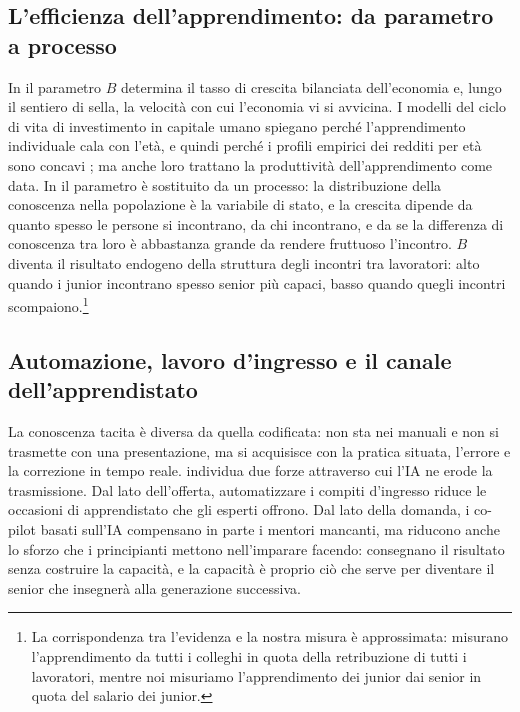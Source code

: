 \documentclass[preprint,12pt,authoryear]{elsarticle}
\begin{document}
\subsection{L'efficienza dell'apprendimento: da parametro a processo}

In \citet{Lucas1988} il parametro $B$ determina il tasso di crescita bilanciata dell'economia e, lungo il sentiero di sella, la velocità con cui l'economia vi si avvicina. I modelli del ciclo di vita di investimento in capitale umano \citep{BenPorath1967} spiegano perché l'apprendimento individuale cala con l'età, e quindi perché i profili empirici dei redditi per età sono concavi \citep{MurphyWelch1990,Lagakos2018}; ma anche loro trattano la produttività dell'apprendimento come data. In \citet{LucasMoll2014} il parametro è sostituito da un processo: la distribuzione della conoscenza nella popolazione è la variabile di stato, e la crescita dipende da quanto spesso le persone si incontrano, da chi incontrano, e da se la differenza di conoscenza tra loro è abbastanza grande da rendere fruttuoso l'incontro. $B$ diventa il risultato endogeno della struttura degli incontri tra lavoratori: alto quando i junior incontrano spesso senior più capaci, basso quando quegli incontri scompaiono.\footnote{La corrispondenza tra l'evidenza e la nostra misura è approssimata: \citet{Jarosch2021} misurano l'apprendimento da tutti i colleghi in quota della retribuzione di tutti i lavoratori, mentre noi misuriamo l'apprendimento dei junior dai senior in quota del salario dei junior.}

\subsection{Automazione, lavoro d'ingresso e il canale dell'apprendistato}

La conoscenza tacita è diversa da quella codificata: non sta nei manuali e non si trasmette con una presentazione, ma si acquisisce con la pratica situata, l'errore e la correzione in tempo reale. \citet{Ide2026} individua due forze attraverso cui l'IA ne erode la trasmissione. Dal lato dell'offerta, automatizzare i compiti d'ingresso riduce le occasioni di apprendistato che gli esperti offrono. Dal lato della domanda, i co-pilot basati sull'IA compensano in parte i mentori mancanti, ma riducono anche lo sforzo che i principianti mettono nell'imparare facendo: consegnano il risultato senza costruire la capacità, e la capacità è proprio ciò che serve per diventare il senior che insegnerà alla generazione successiva.
\end{document}

